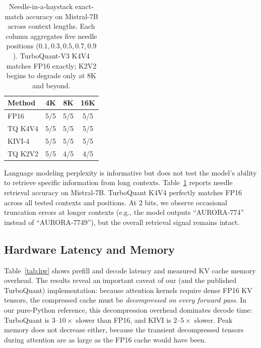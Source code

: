 \documentclass[11pt]{article}
\begin{document}
\begin{table}[t]
\centering
\caption{Needle-in-a-haystack exact-match accuracy on Mistral-7B across context lengths. Each column aggregates five needle positions ($0.1, 0.3, 0.5, 0.7, 0.9$). TurboQuant-V3 K4V4 matches FP16 exactly; K2V2 begins to degrade only at $8$K and beyond.}
\label{tab:needle}
\begin{tabular}{l c c c}
\toprule
Method & 4K & 8K & 16K \\
\midrule
FP16 & 5/5 & 5/5 & 5/5 \\
TQ K4V4 & 5/5 & 5/5 & 5/5 \\
KIVI-4 & 5/5 & 5/5 & 5/5 \\
TQ K2V2 & 5/5 & 4/5 & 4/5 \\
\bottomrule
\end{tabular}
\end{table}

Language modeling perplexity is informative but does not test the model's ability to retrieve specific information from long contexts. Table~\ref{tab:needle} reports needle retrieval accuracy on Mistral-7B. TurboQuant K4V4 perfectly matches FP16 across all tested contexts and positions. At $2$ bits, we observe occasional truncation errors at longer contexts (e.g., the model outputs ``AURORA-774'' instead of ``AURORA-7749''), but the overall retrieval signal remains intact.

\subsection{Hardware Latency and Memory}
\label{sec:hardware}

\begin{table}[t]
\centering
\caption{Hardware benchmarks with $2{,}048$-token prompts and $64$-token generations. Our reference implementation is pure Python / PyTorch and pays a significant decode cost for the normalization, rotation, and bit-unpacking pipeline. ``KV Mem'' is the peak KV cache overhead beyond the model weights. Theoretical compression ratios at $4$ bits are $4\times$.}
\label{tab:hw}
\small

\end{table}

Table~\ref{tab:hw} shows prefill and decode latency and measured KV cache memory overhead. The results reveal an important caveat of our (and the published TurboQuant) implementation: because attention kernels require dense FP16 KV tensors, the compressed cache must be \emph{decompressed on every forward pass}. In our pure-Python reference, this decompression overhead dominates decode time: TurboQuant is $3$--$10\times$ slower than FP16, and KIVI is $2$--$5\times$ slower. Peak memory does not decrease either, because the transient decompressed tensors during attention are as large as the FP16 cache would have been.
\end{document}
